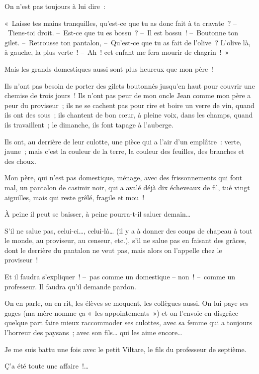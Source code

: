 \documentclass[french,twoside]{book} %
\begin{document}
On n’est pas toujours à lui dire :\par
« Laisse tes mains tranquilles, qu’est-ce que tu as donc fait à ta cravate ? – Tiens-toi droit. – Est-ce que tu es bossu ? – Il est bossu ! – Boutonne ton gilet. – Retrousse ton pantalon, – Qu’est-ce que tu as fait de l’olive ? L’olive là, à gauche, la plus verte ! – Ah ! cet enfant me fera mourir de chagrin ! »\par
\bigbreak
\noindent Mais les grands domestiques aussi sont plus heureux que mon père !\par
Ils n’ont pas besoin de porter des gilets boutonnés jusqu’en haut pour couvrir une chemise de trois jours ! Ils n’ont pas peur de mon oncle Jean comme mon père a peur du proviseur ; ils ne se cachent pas pour rire et boire un verre de vin, quand ils ont des sous ; ils chantent de bon cœur, à pleine voix, dans les champs, quand ils travaillent ; le dimanche, ils font tapage à l’auberge.\par
Ils ont, au derrière de leur culotte, une pièce qui a l’air d’un emplâtre : verte, jaune ; mais c’est la couleur de la terre, la couleur des feuilles, des branches et des choux.\par
Mon père, qui n’est pas domestique, ménage, avec des frissonnements qui font mal, un pantalon de casimir noir, qui a avalé déjà dix écheveaux de fil, tué vingt aiguilles, mais qui reste grêlé, fragile et mou !\par
À peine il peut se baisser, à peine pourra-t-il saluer demain…\par
S’il ne salue pas, celui-ci…, celui-là… (il y a à donner des coups de chapeau à tout le monde, au proviseur, au censeur, etc.), s’il ne salue pas en faisant des grâces, dont le derrière du pantalon ne veut pas, mais alors on l’appelle chez le proviseur !\par
Et il faudra s’expliquer ! – pas comme un domestique – non ! – comme un professeur. Il faudra qu’il demande pardon.\par
On en parle, on en rit, les élèves se moquent, les collègues aussi. On lui paye ses gages (ma mère nomme ça « les appointements ») et on l’envoie en disgrâce quelque part faire mieux raccommoder ses culottes, avec sa femme qui a toujours l’horreur des paysans ; avec son fils… qui les aime encore…\par
\bigbreak
\noindent Je me suis battu une fois avec le petit Viltare, le fils du professeur de septième.\par
Ç’a été toute une affaire !…\par
\end{document}
